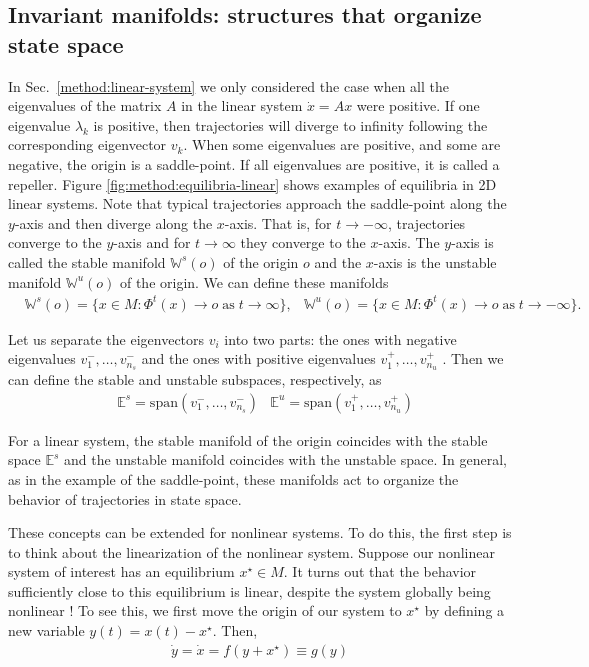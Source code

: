 \subsection{Invariant manifolds: structures that organize state space}\label{method:invariant-manifolds}

In Sec.~\ref{method:linear-system} we only considered the case when all the eigenvalues of the matrix $A$ in the linear system $\dot{x} = A x$ were positive. If one eigenvalue $\lambda_k$ is positive, then trajectories will diverge to infinity following the corresponding eigenvector $v_k$. When some eigenvalues are positive, and some are negative, the origin is a saddle-point. If all eigenvalues are positive, it is called a repeller.
Figure \ref{fig:method:equilibria-linear} shows examples of equilibria in 2D linear systems. Note that typical trajectories approach the saddle-point along the $y$-axis and then diverge along the $x$-axis. That is, for $t \to -\infty$, trajectories converge to the $y$-axis and for $t \to \infty$ they converge to the $x$-axis. The $y$-axis is called the stable manifold $\mathbb{W}^s(o)$ of the origin $o$ and the $x$-axis is the unstable manifold $\mathbb{W}^u(o)$ of the origin. We can define these manifolds
\begin{align}
&\mathbb{W}^s(o) = \{x \in M: \Phi^t(x) \to o \;\mathrm{as}\; t\to\infty\}, 
&\mathbb{W}^u(o) = \{x \in M: \Phi^t(x) \to o \;\mathrm{as }\; t\to -\infty\}.
\end{align}

Let us separate the eigenvectors $v_i$ into two parts: the ones with negative eigenvalues $v^-_1, \ldots, v^-_{n_s}$ and the ones with positive eigenvalues $v^+_1, \ldots, v^+_{n_u}$ . Then we can define the stable and unstable subspaces, respectively, as 
%
\begin{align}
    &\mathbb{E}^s = \mathrm{span}(v^-_1, \ldots, v^-_{n_s})
    &\mathbb{E}^u = \mathrm{span}(v^+_1, \ldots, v^+_{n_u})
\end{align}

For a linear system, the stable manifold of the origin coincides with the stable space $\mathbb{E}^s$ and the unstable manifold coincides with the unstable space.  In general, as in the example of the saddle-point, these manifolds act to organize the behavior of trajectories in state space.


These concepts can be extended for nonlinear systems. To do this, the first step is to think about the linearization of the nonlinear system. Suppose our nonlinear system of interest has an equilibrium $x^\star \in M$. It turns out that the behavior sufficiently close to this equilibrium is linear, despite the system globally being nonlinear \cite{saletan, glendinning}! To see this, we first move the origin of our system to $x^\star$ by defining a new variable $y(t) = x(t) - x^\star$. Then, 
%
\begin{align}
    \dot{y} = \dot{x} = f(y+x^\star) \equiv g(y)
\end{align}

